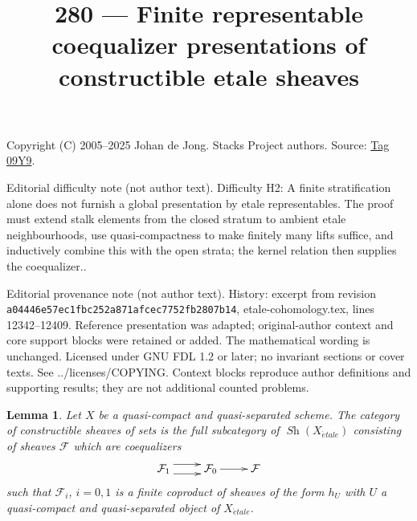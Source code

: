 \documentclass{amsart}
\theoremstyle{plain}
\newtheorem{lemma}[subsection]{Lemma}
\theoremstyle{definition}
\theoremstyle{remark}
\numberwithin{equation}{subsection}
\def\Sh{\mathop{\mathit{Sh}}\nolimits}
\def\etale{{\acute{e}tale}}
\begin{document}
\title[Stacks Project, Tag 09Y9]{280 --- Finite representable coequalizer presentations of constructible etale sheaves}
\maketitle
\noindent Copyright (C) 2005--2025 Johan de Jong. Stacks Project authors. Source: \href{https://stacks.math.columbia.edu/tag/09Y9}{Tag 09Y9}.

\noindent Editorial difficulty note (not author text). Difficulty H2: A finite stratification alone does not furnish a global presentation by etale representables. The proof must extend stalk elements from the closed stratum to ambient etale neighbourhoods, use quasi-compactness to make finitely many lifts suffice, and inductively combine this with the open strata; the kernel relation then supplies the coequalizer..

\noindent Editorial provenance note (not author text). History: excerpt from revision \texttt{a0444\allowbreak 6e57e\allowbreak c1fbc\allowbreak 252a8\allowbreak 71afc\allowbreak ec775\allowbreak 2fb28\allowbreak 07b14}, etale-cohomology.tex, lines 12342--12409. Reference presentation was adapted; original-author context and core support blocks were retained or added. The mathematical wording is unchanged. Licensed under GNU FDL 1.2 or later; no invariant sections or cover texts. See ../licenses/COPYING. Context blocks reproduce author definitions and supporting results; they are not additional counted problems.

\begin{lemma}
\label{lemma-category-constructible-sets}
Let $X$ be a quasi-compact and quasi-separated scheme. The category of
constructible sheaves of sets is the full subcategory of $\Sh(X_\etale)$
consisting of sheaves $\mathcal{F}$ which are coequalizers
$$
\xymatrix{
\mathcal{F}_1
\ar@<1ex>[r] \ar@<-1ex>[r]
&
\mathcal{F}_0 \ar[r]
&
\mathcal{F}}
$$
such that $\mathcal{F}_i$, $i = 0, 1$ is a finite coproduct of sheaves of
the form $h_U$ with $U$ a quasi-compact and quasi-separated
object of $X_\etale$.
\end{lemma}
\end{document}
